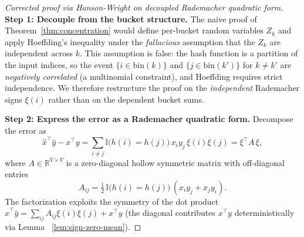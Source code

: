 \documentclass[10pt,twocolumn]{article}
\theoremstyle{definition}
\theoremstyle{remark}
\begin{document}
\begin{proof}[Corrected proof via Hanson-Wright on decoupled Rademacher
quadratic form]
\textbf{Step 1: Decouple from the bucket structure.} The naive proof
of Theorem~\ref{thm:concentration} would define per-bucket random
variables $Z_k$ and apply Hoeffding's inequality under the
\emph{fallacious} assumption that the $Z_k$ are independent across
$k$. This assumption is false: the hash function is a partition of
the input indices, so the event $\{i \in \mathrm{bin}(k)\}$ and
$\{j \in \mathrm{bin}(k')\}$ for $k \neq k'$ are \emph{negatively
correlated} (a multinomial constraint), and Hoeffding requires strict
independence. We therefore restructure the proof on the
\emph{independent} Rademacher signs $\xi(i)$ rather than on the
dependent bucket sums.

\textbf{Step 2: Express the error as a Rademacher quadratic form.}
Decompose the error as
\begin{equation}
\hat{x}^\top \hat{y} - x^\top y
   = \sum_{i \neq j} \mathbb{I}\bigl(h(i) = h(j)\bigr) \, x_i y_j \, \xi(i) \xi(j)
   = \xi^\top A \, \xi,
\label{eq:rademacher-qf}
\end{equation}
where $A \in \mathbb{R}^{V \times V}$ is a zero-diagonal hollow symmetric
matrix with off-diagonal entries
\begin{equation}
A_{ij} = \tfrac{1}{2} \, \mathbb{I}\bigl(h(i) = h(j)\bigr) \, (x_i y_j + x_j y_i).
\label{eq:A-off-diag}
\end{equation}
The factorization exploits the symmetry of the dot product
$\hat{x}^\top \hat{y} = \sum_{ij} A_{ij} \xi(i) \xi(j) + x^\top y$ (the
diagonal contributes $x^\top y$ deterministically via Lemma~
\ref{lem:sign-zero-mean}).


\end{proof}
\end{document}
